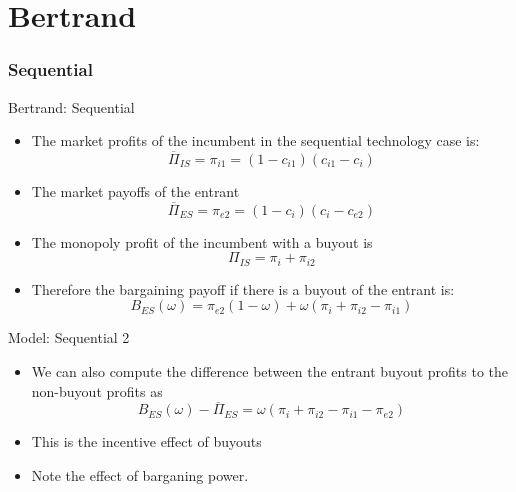 \documentclass{beamer}
\numberwithin{equation}{section}
\begin{document}
\section{Bertrand}
\subsubsection{Sequential}
\begin{frame}{Bertrand: Sequential}
\begin{itemize}
    \item The market profits of the incumbent in the sequential technology case is:
    \begin{equation*}
        \overline{\Pi}_{IS} = \pi_{i1}=(1-c_{i1})(c_{i1}-c_i) 
    \end{equation*}
    \item The market payoffs of the entrant 
    \begin{equation*}
        \overline{\Pi}_{ES} =  
 \pi_{e2}=(1-c_{i})(c_i-c_{e2}) 
    \end{equation*}
    \item The monopoly profit of the incumbent with a buyout is
    \begin{equation*}
        \Pi_{IS} = \pi_{i} +  \pi_{i2} 
    \end{equation*}
    \item Therefore the bargaining payoff if there is a buyout of the entrant is: 
    \begin{equation*}
       B_{ES}(\omega)=  \pi_{e2}(1-\omega)+ \omega (\pi_{i} +  \pi_{i2} - \pi_{i1} )
    \end{equation*}
\end{itemize}
\end{frame}

\begin{frame}{Model: Sequential 2}
\begin{itemize}
    \item We can also compute the difference between the entrant buyout profits to the non-buyout profits as
    \begin{equation*}
        B_{ES}(\omega) - \overline{\Pi}_{ES} = 
\omega (\pi_{i} +  \pi_{i2} - \pi_{i1}-\pi_{e2} )
    \end{equation*}
    \item This is the incentive effect of buyouts
    \item Note the effect of barganing power. 
\end{itemize}
\end{frame}
\end{document}
